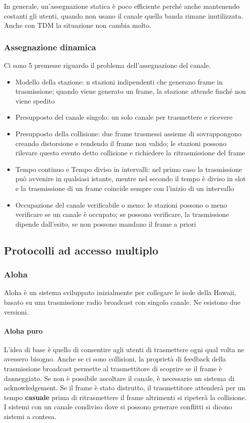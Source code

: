 In generale, un'assegnazione statica è poco efficiente perché anche mantenendo costanti gli utenti,
quando non usano il canale quella banda rimane inutilizzata.
Anche con TDM la situazione non cambia molto.

\subsubsection{Assegnazione dinamica}
Ci sono 5 premesse riguardo il problema dell'assegnazione del canale.
\begin{itemize}
    \item Modello della stazione: n stazioni indipendenti che generano frame in trasmissione;
    quando viene generato un frame, la stazione attende finché non viene spedito
    \item Presupposto del canale singolo: un solo canale per trasmettere e ricevere
    \item Presupposto della collisione: due frame trasmessi assieme di sovrappongono creando distorsione e rendendo il frame non valido;
    le stazioni possono rilevare questo evento detto collisione e richiedere la ritrasmissione del frame
    \item Tempo continuo e Tempo diviso in intervalli: nel primo caso la trasmissione può avvenire in qualsiasi istante,
    mentre nel secondo il tempo è diviso in slot e la trasmissione di un frame coincide sempre con l'inizio di un intervallo
    \item Occupazione del canale verificabile o meno: le stazioni possono o meno verificare se un canale è occupato;
    se possono verificare, la trasmissione dipende dall'esito, se non possono mandano il frame a priori
\end{itemize}

\subsection{Protocolli ad accesso multiplo} %

\subsubsection{Aloha}
Aloha è un sistema sviluppato inizialmente per collegare le isole della Hawaii, basato su una trasmissione radio broadcast con singolo canale.
Ne esistono due versioni.

\paragraph{Aloha puro}
L'idea di base è quello di consentire agli utenti di trasmettere ogni qual volta ne avessero bisogno.
Anche se ci sono collisioni, la proprietà di feedback della trasmissione broadcast permette al trasmettitore di scoprire se il frame è danneggiato.
Se non è possibile ascoltare il canale, è necessario un sistema di acknowledgement.
Se il frame è stato distrutto, il trasmettitore attenderà per un tempo \textbf{casuale} prima di ritrasmettere il frame altrimenti si ripeterà la collisione.
I sistemi con un canale condiviso dove si possono generare conflitti si dicono sistemi a contesa.

